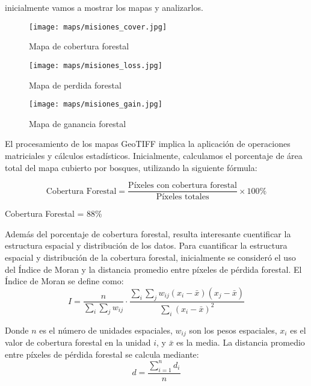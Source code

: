 \documentclass[11pt]{article}
\begin{document}
 inicialmente vamos a mostrar los mapas y analizarlos.

\begin{figure}[H]
        \centering
        \texttt{[image: maps/misiones\_cover.jpg]}
        \caption{Mapa de cobertura forestal}
        \label{fig:smog_rating_modelos}
\end{figure}

\begin{figure}[H]
        \centering
        \texttt{[image: maps/misiones\_loss.jpg]}
        \caption{Mapa de perdida forestal}
        \label{fig:smog_rating_modelos}
\end{figure}

\begin{figure}[H]
        \centering
        \texttt{[image: maps/misiones\_gain.jpg]}
        \caption{Mapa de ganancia forestal}
        \label{fig:smog_rating_modelos}
\end{figure}



El procesamiento de los mapas GeoTIFF implica la aplicación de operaciones matriciales y cálculos estadísticos. Inicialmente, calculamos el porcentaje de área total del mapa cubierto por bosques, utilizando la siguiente fórmula:

\begin{equation}
    \text{Cobertura Forestal} = \frac{\text{Píxeles con cobertura forestal}}{\text{Píxeles totales}} \times 100\%
\end{equation}

Cobertura Forestal = 88\%

Además del porcentaje de cobertura forestal, resulta interesante cuentificar la estructura espacial y distribución de los datos. 
Para cuantificar la estructura espacial y distribución de la cobertura forestal, inicialmente se consideró el uso del Índice de Moran y la distancia promedio entre píxeles de pérdida forestal. El Índice de Moran se define como:
\begin{equation}
    I = \frac{n}{\sum_{i}\sum_{j}w_{ij}} \cdot \frac{\sum_{i}\sum_{j}w_{ij}(x_i-\bar{x})(x_j-\bar{x})}{\sum_{i}(x_i-\bar{x})^2}
\end{equation}

Donde $n$ es el número de unidades espaciales, $w_{ij}$ son los pesos espaciales, $x_i$ es el valor de cobertura forestal en la unidad $i$, y $\bar{x}$ es la media.
La distancia promedio entre píxeles de pérdida forestal se calcula mediante:
\begin{equation}
    d = \frac{\sum_{i=1}^n d_i}{n}
\end{equation}
\end{document}
